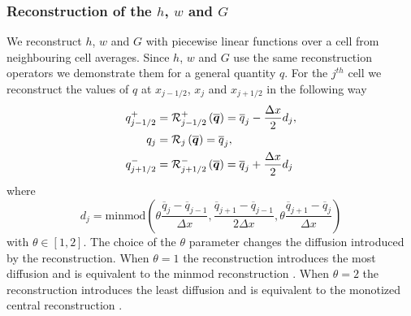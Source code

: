 \subsubsection{Reconstruction of the $h$, $w$ and $G$}
We reconstruct $h$, $w$ and $G$ with piecewise linear functions over a cell from neighbouring cell averages. Since $h$, $w$ and $G$ use the same reconstruction operators we demonstrate them for a general quantity $q$. For the $j^{th}$ cell we reconstruct the values of $q$ at $x_{j-1/2} $, $x_{j} $ and $x_{j+1/2}$ in the following way
\begin{subequations}
	\begin{align}
	q^+_{j-1/2} & = \mathcal{R}^+_{j-1/2} \left(\overline{\boldsymbol{q}}\right) = \overline{q}_j - \dfrac{\Delta x}{2} d_j, \\
	q_{j} &= \mathcal{R}_{j} \left(\overline{\boldsymbol{q}}\right) =\overline{q}_j ,\\
	q^-_{j+1/2} &= \mathcal{R}^-_{j+1/2} \left(\overline{\boldsymbol{q}}\right) = \overline{q}_j + \dfrac{\Delta x}{2} d_j
	\end{align}
	\label{eqn:ReconforhwG}
\end{subequations}
where 
\begin{equation}
d_j = \text{minmod}\left(\theta \dfrac{\overline{q}_j -\overline{q}_{j-1} }{\Delta x}, \dfrac{\overline{q}_{j+1} -\overline{q}_{j-1} }{2\Delta x}, \theta\dfrac{\overline{q}_{j+1} -\overline{q}_{j} }{\Delta x}\right)
\label{eqn:slopehGrecon}
\end{equation}
with $\theta \in \left[1,2\right]$. The choice of the $\theta$ parameter changes the diffusion introduced by the reconstruction. When $\theta =1$ the reconstruction introduces the most diffusion and is equivalent to the minmod reconstruction \cite{Roe-1986-337}. When $\theta = 2$ the reconstruction introduces the least diffusion and is equivalent to the monotized central reconstruction \cite{VanLeer-1977-276}.

